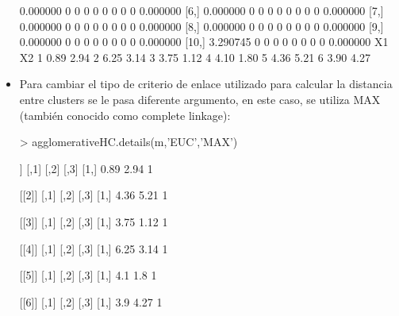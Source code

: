 \documentclass[a4paper, 12pt]{article}
\begin{document}
\begin{itemize}
\begin{Schunk}
\begin{Soutput}
 [5,] 0.000000    0    0    0    0    0    0    0    0 0.000000
 [6,] 0.000000    0    0    0    0    0    0    0    0 0.000000
 [7,] 0.000000    0    0    0    0    0    0    0    0 0.000000
 [8,] 0.000000    0    0    0    0    0    0    0    0 0.000000
 [9,] 0.000000    0    0    0    0    0    0    0    0 0.000000
[10,] 3.290745    0    0    0    0    0    0    0    0 0.000000
    X1   X2
1 0.89 2.94
2 6.25 3.14
3 3.75 1.12
4 4.10 1.80
5 4.36 5.21
6 3.90 4.27
\end{Soutput}
\end{Schunk}
		\item Para cambiar el tipo de criterio de enlace utilizado para calcular la distancia entre clusters se le pasa diferente argumento, en este caso, se utiliza MAX (también conocido como complete linkage):
\begin{Schunk}
\begin{Sinput}
> agglomerativeHC.details(m,'EUC','MAX')
\end{Sinput}
\begin{Soutput}
[[1]]
     [,1] [,2] [,3]
[1,] 0.89 2.94    1

[[2]]
     [,1] [,2] [,3]
[1,] 4.36 5.21    1

[[3]]
     [,1] [,2] [,3]
[1,] 3.75 1.12    1

[[4]]
     [,1] [,2] [,3]
[1,] 6.25 3.14    1

[[5]]
     [,1] [,2] [,3]
[1,]  4.1  1.8    1

[[6]]
     [,1] [,2] [,3]
[1,]  3.9 4.27    1


\end{Soutput}
\end{Schunk}
\end{itemize}
\end{document}
